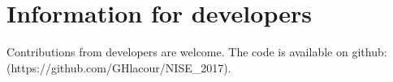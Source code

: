 \chapter{Information for developers\label{chap:developers}}
Contributions from developers are welcome. The code is available on github:\\ (https://github.com/GHlacour/NISE\_2017).
